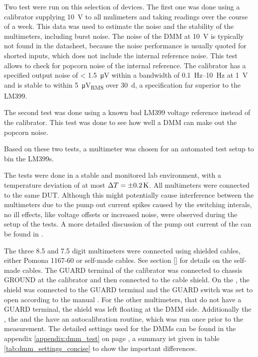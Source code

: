 
Two test were run on this selection of devices. The first one was done using a  calibrator supplying \qty{10}{\volt} to all mulimeters and taking readings over the course of a week. This data was used to estimate the noise and the stability of the multimeters, including burst noise. The noise of the DMM at \qty{10}{\volt} is typically not found in the datasheet, because the noise performance is usually quoted for shorted inputs, which does not include the internal reference noise. This test allows to check for popcorn noise of the internal reference. The calibrator has a specified output noise of \qty{< 1.5}{\micro \volt} within a bandwidth of \qtyrange{0.1}{10}{\Hz} at \qty{1}{\volt} and is stable to within \qty{5}{\micro \volt_{RMS}} over \qty{30}{\day}, a specification far superior to the LM399.

The second test was done using a known bad LM399 voltage reference instead of the calibrator. This test was done to see how well a DMM can make out the popcorn noise.

Based on these two tests, a multimeter was chosen for an automated test setup to bin the LM399s.


The tests were done in a stable and monitored lab environment, with a temperature deviation of at most $\Delta T = \qty{\pm 0.2}{\kelvin}$. All multimeters were connected to the same DUT. Although this might potentially cause interference between the multimeters due to the pump out current spikes caused by the switching interals, no ill effects, like voltage offsets or increased noise, were observed during the setup of the tests. A more detailed discussion of the pump out current of the  can be found in \cite{article_3458A_input_mpedance}.

The three \num{8.5} and \num{7.5} digit multimeters were connected using shielded cables, either Pomona 1167-60 or self-made cables. See section \ref{} for details on the self-made cables. The GUARD terminal of the calibrator was connected to chassis GROUND at the calibrator and then connected to the cable shield. On the , the shield was connected to the GUARD terminal and the GUARD switch was set to open according to the manual \cite{manual_keysight3458a}. For the other multimeters, that do not have a GUARD terminal, the shield was left floating at the DMM side. Additionally the , the  and the  have an autocalibration routine, which was run once prior to the measurement. The detailed settings used for the DMMs can be found in the appendix \ref{appendix:dmm_test} on page \pageref{appendix:dmm_test}, a summary ist given in table \ref{tab:dmm_settings_concise} to show the important differences.


